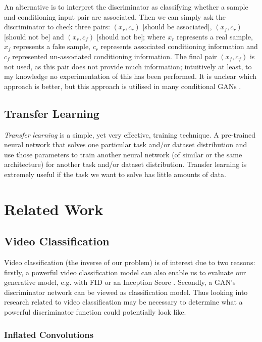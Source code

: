 \documentclass{report}
\newcommand\blankpage{%
    \null
    \thispagestyle{empty}%
    \addtocounter{page}{-1}%
    \newpage}
\theoremstyle{plain}
\theoremstyle{definition}
\theoremstyle{remark}
\numberwithin{equation}{section}
\numberwithin{figure}{section}
\newcommand{\<}{\langle}
\renewcommand{\>}{\rangle}
\begin{document}
An alternative is to interpret the discriminator as classifying whether a sample and conditioning input pair are associated. Then we can simply ask the discriminator to check three pairs: $(x_r, c_r)$ [should be associated], $(x_f, c_r)$ [should not be] and $(x_r, c_f)$ [should not be]; where $x_r$ represents a real sample, $x_f$ represents a fake sample, $c_r$ represents associated conditioning information and $c_f$ represented un-associated conditioning information. The final pair $(x_f, c_f)$ is not used, as this pair does not provide much information; intuitively at least, to my knowledge no experimentation of this has been performed. It is unclear which approach is better, but this approach is utilised in many conditional GANs \cite{pan_create_2018,zhang_stackgan++:_2017}.


\section{Transfer Learning}
\textit{Transfer learning} is a simple, yet very effective, training technique. A pre-trained neural network that solves one particular task and/or dataset distribution and use those parameters to train another neural network (of similar or the same architecture) for another task and/or dataset distribution. Transfer learning is extremely useful if the task we want to solve has little amounts of data.

\blankpage
\chapter{Related Work}

\section{Video Classification}

Video classification (the inverse of our problem) is of interest due to two reasons: firstly, a powerful video classification model can also enable us to evaluate our generative model, e.g. with FID \cite{heusel_gans_2017} or an Inception Score \cite{salimans_improved_2016}. Secondly, a GAN's discriminator network can be viewed as classification model. Thus looking into research related to video classification may be necessary to determine what a powerful discriminator function could potentially look like.

\subsection{Inflated Convolutions}
\end{document}
